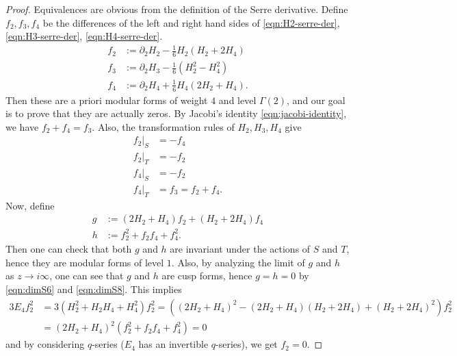 \begin{proof}
Equivalences are obvious from the definition of the Serre derivative.
Define $f_{2}, f_{3}, f_{4}$ be the differences of the left and right hand sides of \eqref{eqn:H2-serre-der}, \eqref{eqn:H3-serre-der}, \eqref{eqn:H4-serre-der}.
\begin{align}
    f_{2} &:= \partial_{2} H_{2} - \frac{1}{6} H_{2}(H_{2} + 2H_{4}) \\
    f_{3} &:= \partial_{2} H_{3} - \frac{1}{6} (H_{2}^2 - H_{4}^2) \\
    f_{4} &:= \partial_{2} H_{4} + \frac{1}{6} H_{4}(2H_{2} + H_{4}).
\end{align}
Then these are a priori modular forms of weight $4$ and level $\Gamma(2)$, and our goal is to prove that they are actually zeros.
By Jacobi's identity \eqref{eqn:jacobi-identity}, we have $f_{2} + f_{4} = f_{3}$.
Also, the transformation rules of $H_2, H_3, H_4$ give
\begin{align}
    f_{2}|_{S} &= -f_{4} \\
    f_{2}|_{T} &= -f_{2} \\
    f_{4}|_{S} &= -f_{2} \\
    f_{4}|_{T} &= f_{3} = f_{2} + f_{4}.
\end{align}
Now, define
\begin{align}
    g &:= (2 H_2 + H_4) f_2 + (H_2 + 2 H_4) f_4 \\
    h &:= f_{2}^{2} + f_{2}f_{4} + f_{4}^{2}.
\end{align}
Then one can check that both $g$ and $h$ are invariant under the actions of $S$ and $T$, hence they are modular forms of level $1$.
Also, by analyzing the limit of $g$ and $h$ as $z \to i \infty$, one can see that $g$ and $h$ are cusp forms, hence $g = h = 0$ by \eqref{eqn:dimS6} and \eqref{eqn:dimS8}.
This implies
\begin{align}
    3 E_4 f_2^{2} &= 3 (H_2^2 + H_2 H_4 + H_4^2) f_2^{2} = ((2 H_2 + H_4)^{2} - (2H_2 + H_4)(H_2 + 2H_4) + (H_2 + 2H_4)^{2}) f_2^{2}\\
    &= (2 H_2 + H_4)^{2} (f_2^2 + f_2 f_4 + f_4^2) = 0
\end{align}
and by considering $q$-series ($E_4$ has an invertible $q$-series), we get $f_2 = 0$.
\end{proof}

